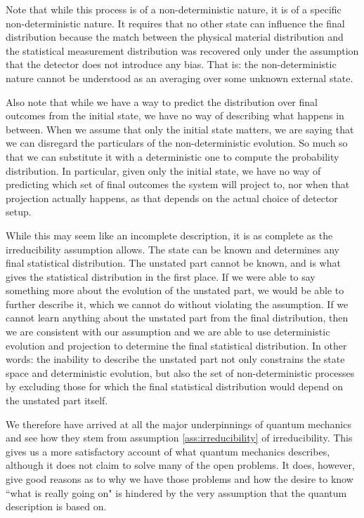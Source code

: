 \documentclass[smallextended]{svjour3}
\numberwithin{equation}{section}
\theoremstyle{definition}
\begin{document}
Note that while this process is of a non-deterministic nature, it is of a specific non-deterministic nature. It requires that no other state can influence the final distribution because the match between the physical material distribution and the statistical measurement distribution was recovered only under the assumption that the detector does not introduce any bias. That is: the non-deterministic nature cannot be understood as an averaging over some unknown external state.

Also note that while we have a way to predict the distribution over final outcomes from the initial state, we have no way of describing what happens in between. When we assume that only the initial state matters, we are saying that we can disregard the particulars of the non-deterministic evolution. So much so that we can substitute it with a deterministic one to compute the probability distribution. In particular, given only the initial state, we have no way of predicting which set of final outcomes the system will project to, nor when that projection actually happens, as that depends on the actual choice of detector setup.

While this may seem like an incomplete description, it is as complete as the irreducibility assumption allows. The state can be known and determines any final statistical distribution. The unstated part cannot be known, and is what gives the statistical distribution in the first place. If we were able to say something more about the evolution of the unstated part, we would be able to further describe it, which we cannot do without violating the assumption. If we cannot learn anything about the unstated part from the final distribution, then we are consistent with our assumption and we are able to use deterministic evolution and projection to determine the final statistical distribution. In other words: the inability to describe the unstated part not only constrains the state space and deterministic evolution, but also the set of non-deterministic processes by excluding those for which the final statistical distribution would depend on the unstated part itself.

We therefore have arrived at all the major underpinnings of quantum mechanics and see how they stem from assumption \ref{ass:irreducibility} of irreducibility. This gives us a more satisfactory account of what quantum mechanics describes, although it does not claim to solve many of the open problems. It does, however, give good reasons as to why we have those problems and how the desire to know ``what is really going on" is hindered by the very assumption that the quantum description is based on.
\end{document}
